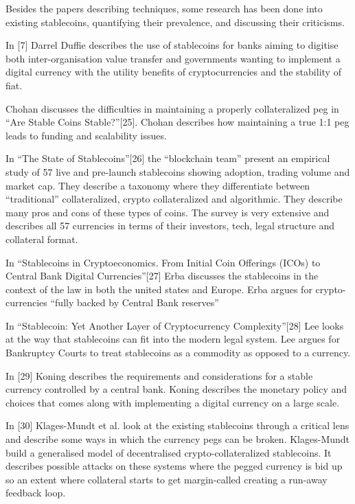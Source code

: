 \documentclass[english,]{IEEEtran}
\begin{document}
Besides the papers describing techniques, some research has been done
into existing stablecoins, quantifying their prevalence, and discussing
their criticisms.

In {[}7{]} Darrel Duffie describes the use of stablecoins for banks
aiming to digitise both inter-organisation value transfer and
governments wanting to implement a digital currency with the utility
benefits of cryptocurrencies and the stability of fiat.

Chohan discusses the difficulties in maintaining a properly
collateralized peg in ``Are Stable Coins Stable?''{[}25{]}. Chohan
describes how maintaining a true 1:1 peg leads to funding and
scalability issues.

In ``The State of Stablecoins''{[}26{]} the ``blockchain team'' present
an empirical study of 57 live and pre-launch stablecoins showing
adoption, trading volume and market cap. They describe a taxonomy where
they differentiate between ``traditional'' collateralized, crypto
collateralized and algorithmic. They describe many pros and cons of
these types of coins. The survey is very extensive and describes all 57
currencies in terms of their investors, tech, legal structure and
collateral format.

In ``Stablecoins in Cryptoeconomics. From Initial Coin Offerings (ICOs)
to Central Bank Digital Currencies''{[}27{]} Erba discusses the
stablecoins in the context of the law in both the united states and
Europe. Erba argues for crypto-currencies ``fully backed by Central Bank
reserves''

In ``Stablecoin: Yet Another Layer of Cryptocurrency
Complexity''{[}28{]} Lee looks at the way that stablecoins can fit into
the modern legal system. Lee argues for Bankruptcy Courts to treat
stablecoins as a commodity as opposed to a currency.

In {[}29{]} Koning describes the requirements and considerations for a
stable currency controlled by a central bank. Koning describes the
monetary policy and choices that comes along with implementing a digital
currency on a large scale.

In {[}30{]} Klages-Mundt et al. look at the existing stablecoins through
a critical lens and describe some ways in which the currency pegs can be
broken. Klages-Mundt build a generalised model of decentralised
crypto-collateralized stablecoins. It describes possible attacks on
these systems where the pegged currency is bid up so an extent where
collateral starts to get margin-called creating a run-away feedback
loop.
\end{document}
